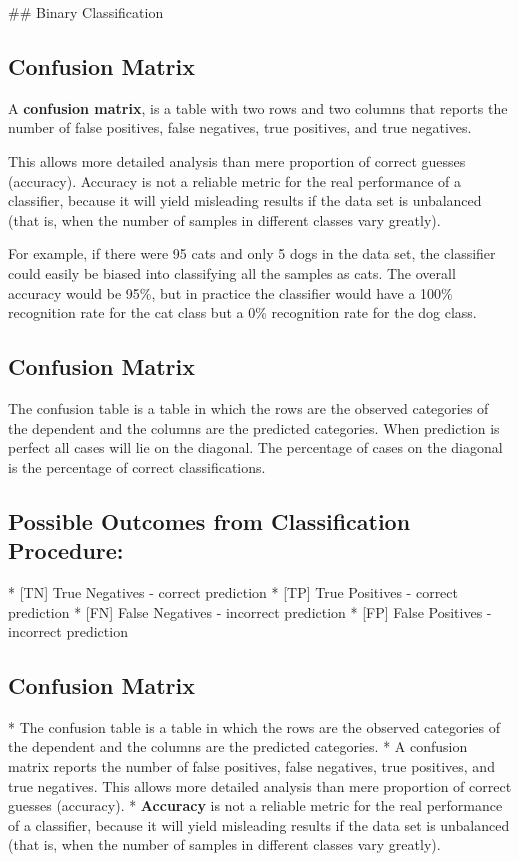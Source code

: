 ﻿## Binary Classification

\subsection{Confusion Matrix}

A \textbf{confusion matrix}, is a table with two rows and two columns that reports the number of false positives, false negatives, true positives, and true negatives.

This allows more detailed analysis than mere proportion of correct guesses (accuracy). Accuracy is not a reliable metric for the real performance of a classifier, because it will yield misleading results if the data set is unbalanced (that is, when the number of samples in different classes vary greatly).

For example, if there were 95 cats and only 5 dogs in the data set, the classifier could easily be biased into classifying all the samples as cats. The overall accuracy would be 95\%, but  in practice the classifier would have a 100\% recognition rate for the cat class but a 0\% recognition rate for the dog class.

\subsection*{Confusion Matrix}
The confusion table is a table in which the rows are the observed categories of
the dependent and the columns are the predicted categories. When prediction
is perfect all cases will lie on the diagonal. The percentage of cases on the
diagonal is the percentage of correct classifications. 
\subsection*{Possible Outcomes from Classification Procedure:}

* [TN] True Negatives - correct prediction
* [TP] True Positives - correct prediction
* [FN] False Negatives - incorrect prediction
* [FP] False Positives - incorrect prediction


\subsection*{Confusion Matrix}

*  The confusion table is a table in which the rows are the observed categories of
the dependent and the columns are the predicted categories. 
*  A confusion matrix reports
the number of false positives, false negatives, true positives, and true
negatives. This allows more detailed analysis than mere proportion of correct guesses
(accuracy). 
*  \textbf{Accuracy} is not a reliable metric for the real performance of a
classifier, because it will yield misleading results if the data set is unbalanced
(that is, when the number of samples in different classes vary greatly).

